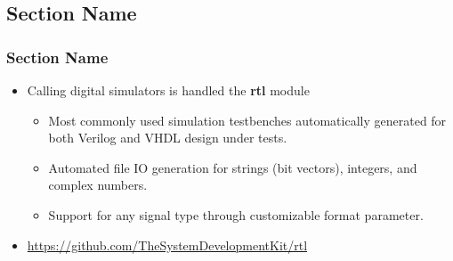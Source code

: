 \documentclass{sdkslides}
\newcommand{\sectname}{Section Name}
\begin{document}
\subsection*{\sectname}
\begin{frame}[t]
    \frametitle{\sectname}
    \begin{itemize}
        \item Calling digital simulators is handled the \textbf{rtl} module
        \begin{itemize}
            \item Most commonly used simulation testbenches automatically
                generated for both Verilog and VHDL design under tests.
            \item Automated file IO generation for strings (bit vectors), integers, and complex numbers. 
            \item Support for any signal type through customizable format
                parameter.
        \end{itemize}
        \item \url{https://github.com/TheSystemDevelopmentKit/rtl}
    \end{itemize}
\end{frame}

\renewcommand{\sectionname}{EM field simulator interface}
\end{document}
